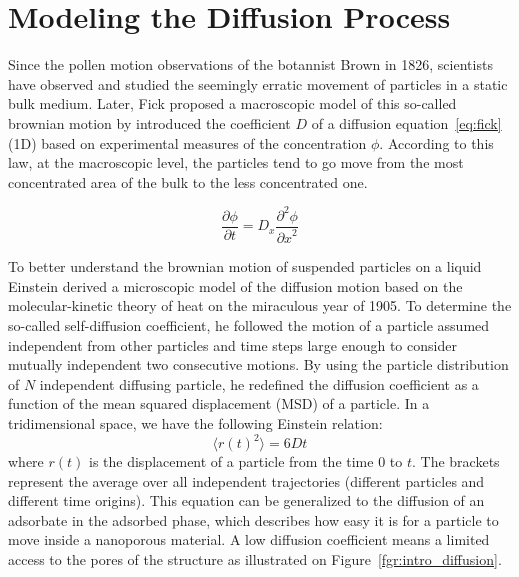 \documentclass[main]{subfiles}
\begin{document}
\section{Modeling the Diffusion Process}

Since the pollen motion observations of the botannist Brown in 1826, scientists have observed and studied the seemingly erratic movement of particles in a static bulk medium. Later, Fick proposed a macroscopic model of this so-called brownian motion by introduced the coefficient $D$ of a diffusion equation~\ref{eq:fick} (1D) based on experimental measures of the concentration $\phi$.\autocite{Fick_1855} According to this law, at the macroscopic level, the particles tend to go move from the most concentrated area of the bulk to the less concentrated one. 

\begin{equation}\label{eq:fick}
  \frac{\partial \phi}{\partial t} = D_x \frac{\partial^2 \phi}{{\partial x}^2}
\end{equation}

To better understand the brownian motion of suspended particles on a liquid Einstein derived a microscopic model of the diffusion motion based on the molecular-kinetic theory of heat on the miraculous year of 1905.\autocite{einstein1905motion} To determine the so-called self-diffusion coefficient, he followed the motion of a particle assumed independent from other particles and time steps large enough to consider mutually independent two consecutive motions.  By using the particle distribution of $N$ independent diffusing particle, he redefined the diffusion coefficient as a function of the mean squared displacement (MSD) of a particle. In a tridimensional space, we have the following Einstein relation:
\begin{equation}\label{eq:einstein}
  \langle {r(t)}^2 \rangle = 6Dt
\end{equation}
where $r(t)$ is the displacement of a particle from the time $0$ to $t$. The brackets represent the average over all independent trajectories (different particles and different time origins). This equation can be generalized to the diffusion of an adsorbate in the adsorbed phase, which describes how easy it is for a particle to move inside a nanoporous material. A low diffusion coefficient means a limited access to the pores of the structure as illustrated on Figure~\ref{fgr:intro_diffusion}.
\end{document}

